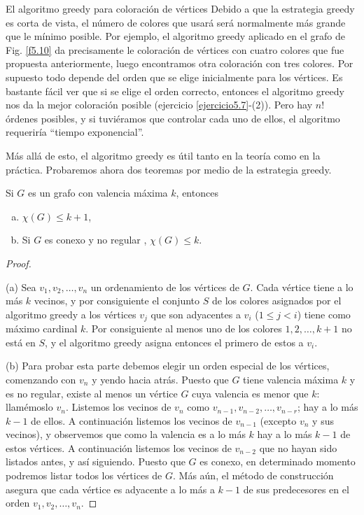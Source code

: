 \begin{section}{El algoritmo greedy para coloración de vértices}
Debido a que la estrategia greedy es corta de vista, el número de
colores que usará será normalmente más grande que le mínimo
posible. Por ejemplo, el algoritmo greedy aplicado en el grafo de
Fig. \ref{f5.10} da precisamente le coloración de vértices con
cuatro colores que fue propuesta anteriormente, luego encontramos
otra coloración con tres colores. Por supuesto todo depende del
orden que se elige inicialmente para los vértices. Es bastante
fácil ver que si se elige el orden correcto, entonces el algoritmo
greedy nos da la mejor coloración posible (ejercicio
\ref{ejercicio5.7}-(2)). Pero hay $n!$ órdenes
posibles, y si tuviéramos que controlar cada uno de ellos, el
algoritmo requeriría ``tiempo exponencial''.

Más allá de esto, el algoritmo greedy es útil tanto en la teoría
como en la práctica. Probaremos ahora dos teoremas por medio de la
estrategia greedy.

\begin{teorema}\label{t5.7.1} Si $G$ es un grafo con valencia máxima
$k$, entonces
\begin{enumerate}[a)]
\item $\chi(G)\le k+1$,
\item Si $G$ es conexo y no regular , $\chi(G) \le k$.
\end{enumerate}
\end{teorema}
\begin{proof}
	\

\noindent (a) Sea $v_1,v_2,\ldots,v_n$ un ordenamiento de los vértices
de $G$. Cada vértice tiene a lo más $k$ vecinos, y por
consiguiente el conjunto $S$ de los colores asignados por el
algoritmo greedy a los vértices $v_j$ que son adyacentes a $v_i$
($1\le j <i$) tiene como máximo cardinal $k$. Por consiguiente al
menos uno de los colores $1,2,\dots,k+1$ no está en $S$, y el
algoritmo greedy asigna entonces el primero de estos a $v_i$.

\noindent (b) Para probar esta parte debemos elegir un orden especial de
los vértices, comenzando con $v_n$ y yendo hacia atrás. Puesto que
$G$ tiene valencia máxima $k$ y es no regular, existe al menos un
vértice $G$ cuya valencia es menor que $k$: llamémoslo $v_n$.
Listemos los vecinos de $v_n$ como
$v_{n-1},v_{n-2},\ldots,v_{n-r}$; hay a lo más $k-1$ de ellos. A
continuación listemos los vecinos de $v_{n-1}$ (excepto $v_n$ y
sus vecinos), y observemos que como la valencia es a lo más $k$
hay a lo más $k-1$ de estos vértices. A continuación listemos los
vecinos de $v_{n-2}$ que no hayan sido listados antes, y así
siguiendo. Puesto que $G$ es conexo, en determinado momento
podremos listar todos los vértices de $G$. Más aún, el método de
construcción asegura que cada vértice es adyacente a lo más a
$k-1$ de sus predecesores en el orden $v_1,v_2,\ldots,v_n$.


\end{proof}
\end{section}
